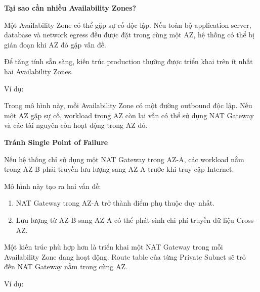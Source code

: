 \vspace{0.5em}\noindent\textbf{Tại sao cần nhiều Availability
Zones?}\par

Một Availability Zone có thể gặp sự cố độc lập. Nếu toàn bộ application
server, database và network egress đều được đặt trong cùng một AZ, hệ
thống có thể bị gián đoạn khi AZ đó gặp vấn đề.

Để tăng tính sẵn sàng, kiến trúc production thường được triển khai trên
ít nhất hai Availability Zones.

Ví dụ:

\begin{Shaded}
\begin{Highlighting}[]

\end{Highlighting}
\end{Shaded}

Trong mô hình này, mỗi Availability Zone có một đường outbound độc lập.
Nếu một AZ gặp sự cố, workload trong AZ còn lại vẫn có thể sử dụng NAT
Gateway và các tài nguyên còn hoạt động trong AZ đó.

\vspace{0.5em}\noindent\textbf{Tránh Single Point of
Failure}\par

Nếu hệ thống chỉ sử dụng một NAT Gateway trong AZ-A, các workload nằm
trong AZ-B phải truyền lưu lượng sang AZ-A trước khi truy cập Internet.

Mô hình này tạo ra hai vấn đề:

\begin{enumerate}
\def\labelenumi{\arabic{enumi}.}
\tightlist
\item
  NAT Gateway trong AZ-A trở thành điểm phụ thuộc duy nhất.
\item
  Lưu lượng từ AZ-B sang AZ-A có thể phát sinh chi phí truyền dữ liệu
  Cross-AZ.
\end{enumerate}

Một kiến trúc phù hợp hơn là triển khai một NAT Gateway trong mỗi
Availability Zone đang hoạt động. Route table của từng Private Subnet sẽ
trỏ đến NAT Gateway nằm trong cùng AZ.

Ví dụ:

